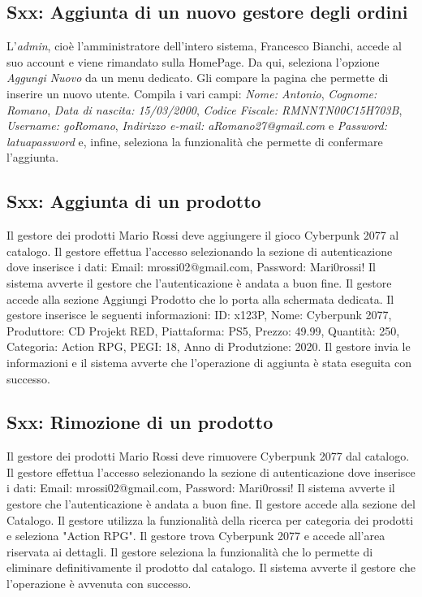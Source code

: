 \documentclass[12pt, a4paper, oneside]{book}
\begin{document}
    \subsection*{Sxx: Aggiunta di un nuovo gestore degli ordini}
    L'\textit{admin}, cioè l'amministratore dell'intero sistema, Francesco Bianchi, accede al suo account e viene rimandato sulla HomePage. Da qui, seleziona l'opzione \textit{Aggungi Nuovo} da un menu dedicato. Gli compare la pagina che permette di inserire un nuovo utente. Compila i vari campi: \textit{Nome: Antonio}, \textit{Cognome: Romano}, \textit{Data di nascita: 15/03/2000}, \textit{Codice Fiscale: RMNNTN00C15H703B}, \textit{Username: goRomano}, \textit{Indirizzo e-mail: aRomano27@gmail.com} e \textit{Password: latuapassword} e, infine, seleziona la funzionalità che permette di confermare l'aggiunta.

    \subsection*{Sxx: Aggiunta di un prodotto}
    Il gestore dei prodotti Mario Rossi deve aggiungere il gioco Cyberpunk 2077 al catalogo. Il gestore
    effettua l'accesso selezionando la sezione di autenticazione dove inserisce i dati: Email: mrossi02@gmail.com, Password: Mari0rossi!
    Il sistema avverte il gestore che l'autenticazione è andata a buon fine. Il gestore accede alla sezione
    Aggiungi Prodotto che lo porta alla schermata dedicata. Il gestore inserisce le seguenti informazioni:
    ID: x123P, Nome: Cyberpunk 2077, Produttore: CD Projekt RED, Piattaforma: PS5, Prezzo: 49.99, Quantità: 250,
    Categoria: Action RPG, PEGI: 18, Anno di Produtzione: 2020. Il gestore invia le informazioni
    e il sistema avverte che l'operazione di aggiunta è stata eseguita con successo.

    \subsection*{Sxx: Rimozione di un prodotto}
    Il gestore dei prodotti Mario Rossi deve rimuovere Cyberpunk 2077 dal catalogo.
    Il gestore effettua l'accesso selezionando la sezione di autenticazione dove inserisce i dati: Email: mrossi02@gmail.com, Password: Mari0rossi!
    Il sistema avverte il gestore che l'autenticazione è andata a buon fine. Il gestore accede alla sezione del Catalogo.
    Il gestore utilizza la funzionalità della ricerca per categoria dei prodotti e seleziona "Action RPG". Il gestore
    trova Cyberpunk 2077 e accede all'area riservata ai dettagli. Il gestore seleziona la funzionalità che lo
    permette di eliminare definitivamente il prodotto dal catalogo. Il sistema avverte il gestore che l'operazione è avvenuta con successo.
\end{document}
